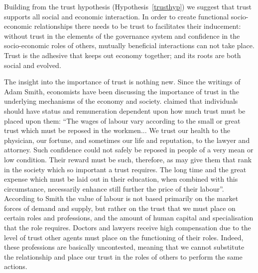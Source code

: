 \begin{subappendices}
Building from the trust hypothesis (Hypothesis~\ref{trusthyp}) we suggest that trust supports all social and economic interaction. In order to create functional socio-economic relationships there needs to be trust to facilitates their inducement: without trust in the elements of the governance system and confidence in the socio-economic roles of others, mutually beneficial interactions can not take place. Trust is the adhesive that keeps out economy together; and its roots are both social and evolved.

The insight into the importance of trust is nothing new. Since the writings of Adam Smith, economists have been discussing the importance of trust in the underlying mechanisms of the economy and society. \citet[p.~91]{Smith1776} claimed that individuals should have status and remuneration dependent upon how much trust must be placed upon them: ``The wages of labour vary according to the small or great trust which must be reposed in the workmen... We trust our health to the physician, our fortune, and sometimes our life and reputation, to the lawyer and attorney. Such confidence could not safely be reposed in people of a very mean or low condition. Their reward must be such, therefore, as may give them that rank in the society which so important a trust requires. The long time and the great expense which must be laid out in their education, when combined with this circumstance, necessarily enhance still further the price of their labour''. According to Smith the value of labour is not based primarily on the market forces of demand and supply, but rather on the trust that we must place on certain roles and professions, and the amount of human capital and specialisation that the role requires. Doctors and lawyers receive high compensation due to the level of trust other agents must place on the functioning of their roles. Indeed, these professions are basically uncontested, meaning that we cannot substitute the relationship and place our trust in the roles of others to perform the same actions.


\end{subappendices}
